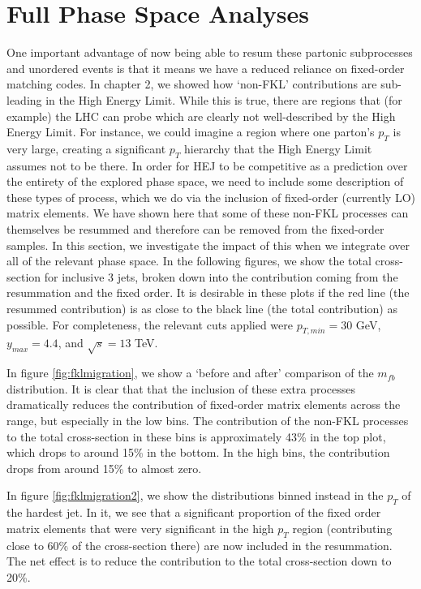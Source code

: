 \section{Full Phase Space Analyses}

One important advantage of now being able to resum these partonic subprocesses and unordered events is that it means we have a reduced reliance on fixed-order matching codes. In chapter 2, we showed how `non-FKL' contributions are sub-leading in the High Energy Limit. While this is true, there are regions that (for example) the LHC can probe which are clearly not well-described by the High Energy Limit. For instance, we could imagine a region where one parton's $p_T$ is very large, creating a significant $p_T$ hierarchy that the High Energy Limit assumes not to be there. In order for HEJ to be competitive as a prediction over the entirety of the explored phase space, we need to include some description of these types of process, which we do via the inclusion of fixed-order (currently LO) matrix elements. We have shown here that some of these non-FKL processes can themselves be resummed and therefore can be removed from the fixed-order samples. In this section, we investigate the impact of this when we integrate over all of the relevant phase space. In the following figures, we show the total cross-section for inclusive 3 jets, broken down into the contribution coming from the resummation and the fixed order. It is desirable in these plots if the red line (the resummed contribution) is as close to the black line (the total contribution) as possible. For completeness, the relevant cuts applied were $p_{T,min} = 30$ GeV, $y_{max} = 4.4$, and $\sqrt{s} = 13$ TeV. 

In figure \ref{fig:fklmigration}, we show a `before and after' comparison of the $m_{fb}$ distribution. It is clear that that the inclusion of these extra processes dramatically reduces the contribution of fixed-order matrix elements across the range, but especially in the low bins. The contribution of the non-FKL processes to the total cross-section in these bins is approximately 43\% in the top plot, which drops to around 15\% in the bottom. In the high bins, the contribution drops from around 15\% to almost zero. 

In figure \ref{fig:fklmigration2}, we show the distributions binned instead in the $p_T$ of the hardest jet. In it, we see that a significant proportion of the fixed order matrix elements that were very significant in the high $p_T$ region (contributing close to 60\% of the cross-section there) are now included in the resummation. The net effect is to reduce the contribution to the total cross-section down to 20\%. 

